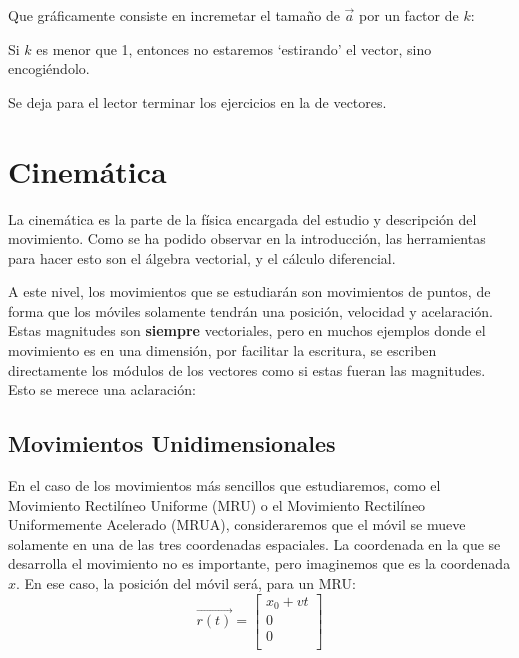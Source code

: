 \documentclass[ %
    oneside,    %
    10pt        %
]{apuntes} %
\begin{document}
Que gráficamente consiste en incremetar el tamaño de $\vec{a}$ por un factor de $k$:
\begin{figure}[ht]
	\centering
\end{figure}

Si $k$ es menor que 1, entonces no estaremos `estirando' el vector, sino encogiéndolo.
\par Se deja para el lector terminar los ejercicios en la  de vectores.

\section{Cinemática}
La cinemática es la parte de la física encargada del estudio y descripción del movimiento. Como se ha podido observar en la introducción, las herramientas para hacer esto son el álgebra vectorial, y el cálculo diferencial.
\par A este nivel, los movimientos que se estudiarán son movimientos de puntos, de forma que los móviles solamente tendrán una posición, velocidad y acelaración. Estas magnitudes son \textbf{siempre} vectoriales, pero en muchos ejemplos donde el movimiento es en una dimensión, por facilitar la escritura, se escriben directamente los módulos de los vectores como si estas fueran las magnitudes. Esto se merece una aclaración:

\subsection{Movimientos Unidimensionales}
En el caso de los movimientos más sencillos que estudiaremos, como el Movimiento Rectilíneo Uniforme (MRU) o el Movimiento Rectilíneo Uniformemente Acelerado (MRUA), consideraremos que el móvil se mueve solamente en una de las tres coordenadas espaciales. La coordenada en la que se desarrolla el movimiento no es importante, pero imaginemos que es la coordenada $x$. En ese caso, la posición del móvil será, para un MRU:
\[\vec{r(t)} = \left[\begin{array}{c}
			x_0 + v t \\
			0         \\
			0         \\
		\end{array}\right]\]
\end{document}
